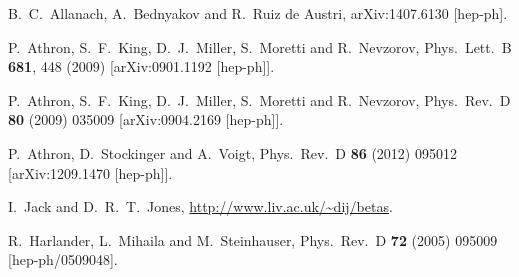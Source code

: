 \documentclass[final,3p,11pt,pdflatex]{elsarticle}
\newcommand{\ptitle}[1]{\emph{#1}}
\renewcommand{\ptitle}[1]{}
\begin{document}
\begin{thebibliography}{100}
  B.~C.~Allanach, A.~Bednyakov and R.~Ruiz de Austri,
  arXiv:1407.6130 [hep-ph].

  P.~Athron, S.~F.~King, D.~J.~Miller, S.~Moretti and R.~Nevzorov,
  Phys.\ Lett.\ B {\bf 681}, 448 (2009)
  [arXiv:0901.1192 [hep-ph]].


  P.~Athron, S.~F.~King, D.~J.~Miller, S.~Moretti and R.~Nevzorov,
  Phys.\ Rev.\ D {\bf 80} (2009) 035009
  [arXiv:0904.2169 [hep-ph]].



  P.~Athron, D.~Stockinger and A.~Voigt,
  Phys.\ Rev.\ D {\bf 86} (2012) 095012
  [arXiv:1209.1470 [hep-ph]].


  I.~Jack and D.~R.~T.~Jones, \ptitle{
    3-loop MSSM beta functions,}
  \url{http://www.liv.ac.uk/~dij/betas}.

  R.~Harlander, L.~Mihaila and M.~Steinhauser,
  Phys.\ Rev.\ D {\bf 72} (2005) 095009
  [hep-ph/0509048].

\end{thebibliography}
\end{document}
